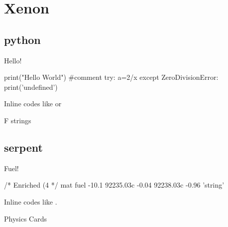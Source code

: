 \chapter{Xenon}
\section{python}

\begin{code}\caption{Hello!} \begin{python}
    print("Hello World") #comment
    try:
        a=2/x
    except ZeroDivisionError:
        print('undefined')
\end{python}\label{code:hello}\end{code}

Inline codes like  or 

\begin{code}\caption{F strings}
\label{code:fstrings}\end{code}

\newpage
\section{serpent}

\begin{code}\caption{Fuel!} \begin{serpent}
    /*
    Enriched (4%
    */
    mat fuel     -10.1
    92235.03c    -0.04 
    92238.03c    -0.96
    'string'
\end{serpent}\label{code:fuel}\end{code}

Inline codes like .

\begin{code}\caption{Physics Cards}
    \label{code:physics}\end{code}